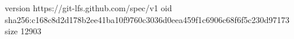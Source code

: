 version https://git-lfs.github.com/spec/v1
oid sha256:c168c8d2d178b2ee41ba10f9760c3036d0eea459f1c6906c68f6f5c230d97173
size 12903

